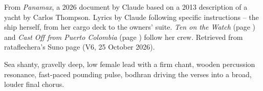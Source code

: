 
\label{sec:the-tucuxi}
\begin{notes}
From \emph{Panamax}, a 2026 document by Claude based on a 2013 description of a yacht by Carlos Thompson. Lyrics by Claude following specific instructions -- the ship herself, from her cargo deck to the owners' suite. \emph{Ten on the Watch} (page \pageref{sec:ten-on-the-watch}) and \emph{Cast Off from Puerto Colombia} (page \pageref{sec:cast-off-from-puerto-colombia}) follow her crew. Retrieved from rataflechera's Suno page (V6, 25 October 2026).
\end{notes}
\begin{style}
Sea shanty, gravelly deep, low female lead with a firm chant, wooden percussion resonance, fast-paced pounding pulse, bodhran driving the verses into a broad, louder final chorus.
\end{style}
